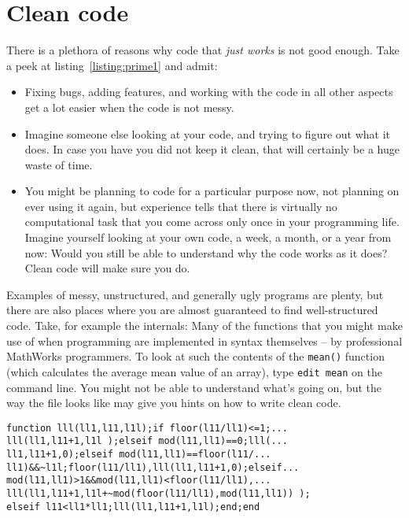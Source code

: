 \newpage
\section{Clean code}

There is a plethora of reasons why code that \emph{just works\texttrademark}
is not good enough. Take a peek at listing~\ref{listing:prime1} and admit:

\begin{itemize}
\item Fixing bugs, adding features, and working with the code in all other
  aspects get a lot easier when the code is not messy.
\item Imagine someone else looking at your code, and trying to figure out what
  it does. In case you have you did not keep it clean, that will certainly be a
  huge waste of time.
\item You might be planning to code for a particular purpose now, not planning
  on ever using it again, but experience tells that there is virtually no
  computational task that you come across only once in your programming life.
  Imagine yourself looking at your own code, a week, a month, or a year from
  now: Would you still be able to understand why the code works as it does?
  Clean code will make sure you do.
\end{itemize}

Examples of messy, unstructured, and generally ugly programs are plenty, but
there are also places where you are almost guaranteed to find well-structured
code. Take, for example the \matlab{} internals: Many of the functions that
you might make use of when programming \matlab{} are implemented in \matlab{}
syntax themselves -- by professional MathWorks programmers. To look at such
the contents of the \lstinline!mean()! function (which calculates the average
mean value of an array), type \lstinline!edit mean! on the \matlab{} command
line. You might not be able to understand what's going on, but the way the
file looks like may give you hints on how to write clean code.


\begin{lstlisting}[framerule=2pt,rulecolor=\color{badred},float=b,label={listing:prime1},caption={Perfectly legal \matlab{} code, with all rules of style ignored. Can you guess what this function does?}]
function lll(ll1,l11,l1l);if floor(l11/ll1)<=1;...
lll(ll1,l11+1,l1l );elseif mod(l11,ll1)==0;lll(...
ll1,l11+1,0);elseif mod(l11,ll1)==floor(l11/...
ll1)&&~l1l;floor(l11/ll1),lll(ll1,l11+1,0);elseif...
mod(l11,ll1)>1&&mod(l11,ll1)<floor(l11/ll1),...
lll(ll1,l11+1,l1l+~mod(floor(l11/ll1),mod(l11,ll1)) );
elseif l11<ll1*ll1;lll(ll1,l11+1,l1l);end;end
\end{lstlisting}

